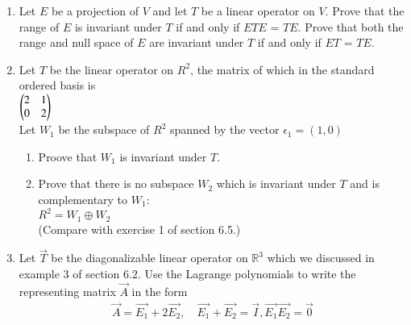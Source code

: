 \renewcommand{\theequation}{\theenumi}
\renewcommand{\thefigure}{\theenumi}
\begin{enumerate}[label=\thesubsection.\arabic*.,ref=\thesubsection.\theenumi]

\item Let $E$ be a projection of $V$ and let $T$ be a linear operator on $V$. Prove that the range of $E$ is invariant under $T$ if and only if $ETE$ = $TE$. Prove that both the range and null space of $E$ are invariant under $T$ if and only if $ET$ = $TE$. 
%
\\
\solution

\item Let $T$ be the linear operator on $R^2$, the matrix of which in the standard ordered basis is \\
$\begin{pmatrix}2&1\\0&2\end{pmatrix}$\\
Let $W_1$ be the subspace of $R^2$ spanned by the vector $\epsilon_1=(1,0)$
\begin{enumerate}
\item Proove that $W_1$ is invariant under $T$.
\item Prove that there is no subspace $W_2$ which is invariant under $T$ and is complementary to $W_1$:\\
$R^2=W_1\oplus W_2$\\
(Compare with exercise 1 of section 6.5.)
\end{enumerate}
%
\solution

%
\item %
Let $\vec{T}$ be the diagonalizable linear operator on $\mathbb{R}^3$ which we discussed in example 3 of section $6.2$. Use the Lagrange polynomials to write the representing matrix $\vec{A}$ in the form
\begin{align}
    \vec{A}=\vec{E_1}+2\vec{E_2},\quad \vec{E_1}+\vec{E_2}=\vec{I}, \vec{E_1}\vec{E_2}=\vec{0}
\end{align}
%
\solution

\end{enumerate}
